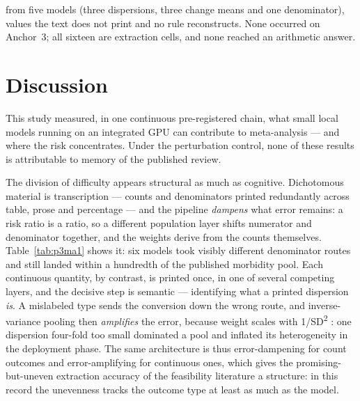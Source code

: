 \documentclass[11pt]{article}
\begin{document}
from five models (three dispersions, three change means and one denominator), values the text does not print and no rule reconstructs. None occurred on Anchor~3; all sixteen are extraction cells, and none reached an arithmetic answer.

\section{Discussion}

This study measured, in one continuous pre-registered chain, what small local models running on an integrated GPU can contribute to meta-analysis --- and where the risk concentrates. Under the perturbation control, none of these results is attributable to memory of the published review.

The division of difficulty appears structural as much as cognitive. Dichotomous material is transcription --- counts and denominators printed redundantly across table, prose and percentage --- and the pipeline \emph{dampens} what error remains: a risk ratio is a ratio, so a different population layer shifts numerator and denominator together, and the weights derive from the counts themselves. Table~\ref{tab:p3ma1} shows it: six models took visibly different denominator routes and still landed within a hundredth of the published morbidity pool. Each continuous quantity, by contrast, is printed once, in one of several competing layers, and the decisive step is semantic --- identifying what a printed dispersion \emph{is}. A mislabeled type sends the conversion down the wrong route, and inverse-variance pooling then \emph{amplifies} the error, because weight scales with 1/SD\textsuperscript{2} \citep{higgins2023handbook}: one dispersion four-fold too small dominated a pool and inflated its heterogeneity in the deployment phase. The same architecture is thus error-dampening for count outcomes and error-amplifying for continuous ones, which gives the promising-but-uneven extraction accuracy of the feasibility literature \citep{schmidt2024exploring} a structure: in this record the unevenness tracks the outcome type at least as much as the model.
\end{document}
